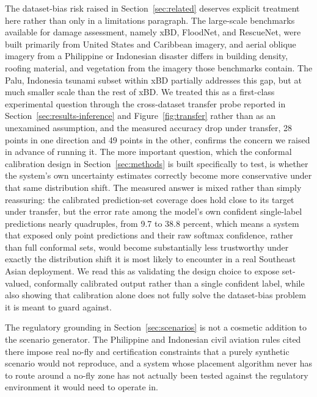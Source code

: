 \documentclass[drones,article,submit,moreauthors]{Definitions/mdpi}
\begin{document}
The dataset-bias risk raised in Section~\ref{sec:related} deserves explicit treatment here rather than only in a limitations paragraph. The large-scale benchmarks available for damage assessment, namely xBD, FloodNet, and RescueNet, were built primarily from United States and Caribbean imagery, and aerial oblique imagery from a Philippine or Indonesian disaster differs in building density, roofing material, and vegetation from the imagery those benchmarks contain. The Palu, Indonesia tsunami subset within xBD partially addresses this gap, but at much smaller scale than the rest of xBD. We treated this as a first-class experimental question through the cross-dataset transfer probe reported in Section~\ref{sec:results-inference} and Figure~\ref{fig:transfer} rather than as an unexamined assumption, and the measured accuracy drop under transfer, 28 points in one direction and 49 points in the other, confirms the concern we raised in advance of running it. The more important question, which the conformal calibration design in Section~\ref{sec:methods} is built specifically to test, is whether the system's own uncertainty estimates correctly become more conservative under that same distribution shift. The measured answer is mixed rather than simply reassuring: the calibrated prediction-set coverage does hold close to its target under transfer, but the error rate among the model's own confident single-label predictions nearly quadruples, from 9.7 to 38.8 percent, which means a system that exposed only point predictions and their raw softmax confidence, rather than full conformal sets, would become substantially less trustworthy under exactly the distribution shift it is most likely to encounter in a real Southeast Asian deployment. We read this as validating the design choice to expose set-valued, conformally calibrated output rather than a single confident label, while also showing that calibration alone does not fully solve the dataset-bias problem it is meant to guard against.

The regulatory grounding in Section~\ref{sec:scenarios} is not a cosmetic addition to the scenario generator. The Philippine and Indonesian civil aviation rules cited there impose real no-fly and certification constraints that a purely synthetic scenario would not reproduce, and a system whose placement algorithm never has to route around a no-fly zone has not actually been tested against the regulatory environment it would need to operate in.
\end{document}

